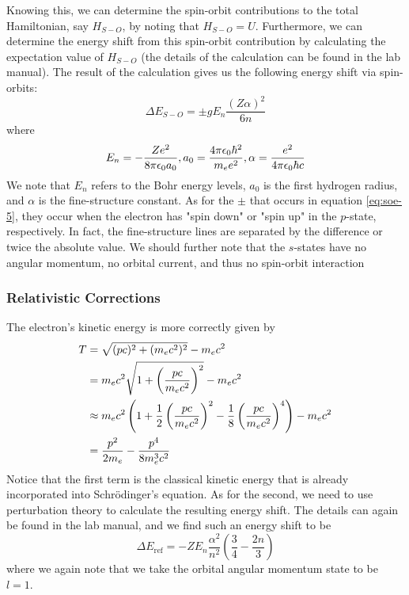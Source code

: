 \documentclass[twocolumn,amsmath,amssymb,pra, floatfix]{revtex4-2}
\begin{document}
Knowing this, we can determine the spin-orbit contributions to the total Hamiltonian, say $H_{S-O}$, by noting that $H_{S-O} = U$. Furthermore, we can determine the energy shift from this spin-orbit contribution by calculating the expectation value of $H_{S-O}$ (the details of the calculation can be found in the lab manual). The result of the calculation gives us the following energy shift via spin-orbits:
\begin{equation}
    \Delta E_{S-O} = \pm g E_{n} \frac{(Z \alpha)^{2}}{6 n} 
    \label{eq:soe-5}
\end{equation}
where 
\begin{equation}
    E_{n} = - \frac{Z e^{2}}{8 \pi \epsilon_{0} a_{0}},
    a_{0} = \frac{4 \pi \epsilon_{0} \hbar^{2}}{m_{e} e^{2}},
    \alpha = \frac{e^{2}}{4 \pi \epsilon_{0} \hbar c}
    \notag
\end{equation}
We note that $E_{n}$ refers to the Bohr energy levels, $a_{0}$ is the first hydrogen radius, and $\alpha$ is the fine-structure constant. As for the $\pm$ that occurs in equation \ref{eq:soe-5}, they occur when the electron has "spin down" or "spin up" in the $p$-state, respectively. In fact, the fine-structure lines are separated by the difference or twice the absolute value. We should further note that the $s$-states have no angular momentum, no orbital current, and thus no spin-orbit interaction

\subsubsection{Relativistic Corrections}
The electron's kinetic energy is more correctly given by 
\begin{align}
    T
    &= 
    \sqrt{(p c)^{2} + (m_{e} c^{2})^{2}} - m_{e} c^{2} 
    \notag 
    \\
    &=
    m_{e} c^{2} \sqrt{1 + \left( \frac{pc}{m_{e} c^{2}} \right)^{2}} - m_{e} c^{2}
    \notag 
    \\
    &\approx 
    m_{e} c^{2} 
    \left(
        1 + \frac{1}{2} \left( \frac{p c}{m_{e} c^{2}} \right)^{2}
        - \frac{1}{8} \left( \frac{p c}{m_{e} c^{2}} \right)^{4}
    \right) 
    - m_{e} c^{2} 
    \notag
    \\
    &=
    \frac{p^{2}}{2 m_{e}} - \frac{p^{4}}{8 m_{e}^{3} c^{2}}
    \label{eq:rc-1}
\end{align}
Notice that the first term is the classical kinetic energy that is already incorporated into Schr\"{o}dinger's equation. As for the second, we need to use perturbation theory to calculate the resulting energy shift. The details can again be found in the lab manual, and we find such an energy shift to be 
\begin{equation}
    \Delta E_{\mathrm{ref}}
    =
    - Z E_{n} \frac{\alpha^{2}}{n^{2}} 
    \left(\frac{3}{4} - \frac{2 n}{3} \right)
    \label{eq:rc-2}
\end{equation}
where we again note that we take the orbital angular momentum state to be $l = 1$.
\end{document}
